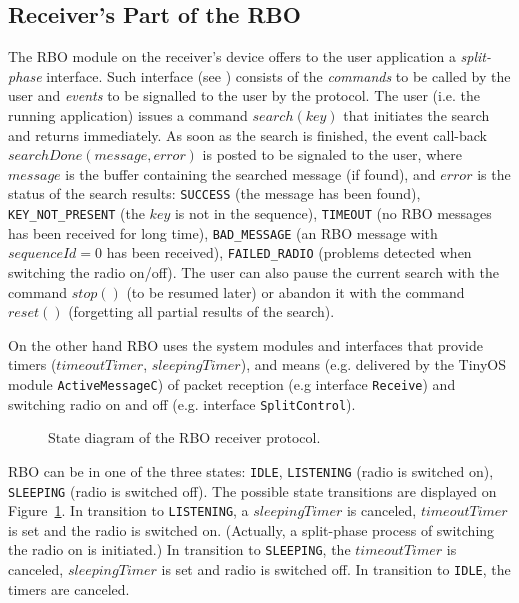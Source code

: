 \documentclass{llncs}
\begin{document}
\subsection{Receiver's Part of the RBO}
The RBO module on the receiver's device offers to the user application a {\em split-phase}
interface.
Such interface (see \cite{TinyOSProgramming}) consists of the {\em commands}
to be called by the user and {\em events} to be signalled to the user by the protocol. 
The user (i.e. the running application) issues a command $search(key)$ that initiates
the search and returns immediately.
As soon as the search is finished, the  event call-back $searchDone(message, error)$
is posted to be signaled to the user,
where $message$ is the buffer containing the searched message (if found),
and $error$ is the status of the search results: 
\verb|SUCCESS| (the message has been found),
\verb|KEY_NOT_PRESENT| (the $key$ is not in the sequence),
\verb|TIMEOUT| (no RBO messages has been received for long time),
\verb|BAD_MESSAGE| (an RBO message with $sequenceId=0$ has been received),
\verb|FAILED_RADIO| (problems detected when switching the radio on/off).
The user can also pause the current search with the command $stop()$ 
(to be resumed later) %
or abandon it with the command $reset()$ (forgetting all partial results of the search).

On the other hand RBO uses the system modules and interfaces that 
provide timers ($timeoutTimer$, $sleepingTimer$), 
and means (e.g. delivered by the TinyOS module \verb|ActiveMessageC|) of packet reception (e.g interface \verb|Receive|) 
and switching radio on and off (e.g. interface \verb|SplitControl|).  
\begin{figure}
\caption{State diagram of the RBO receiver protocol.\label{RBO-states}}
\end{figure}
RBO can be in one of the three states: 
\verb|IDLE|, 
\verb|LISTENING| (radio is switched on),
\verb|SLEEPING| (radio is switched off).
The possible state transitions are displayed on Figure~\ref{RBO-states}.
In transition to \verb|LISTENING|,  a $sleepingTimer$ is canceled,  $timeoutTimer$ is set 
and the radio is switched on. 
(Actually, a split-phase process of switching the radio on
is initiated.)
In transition to \verb|SLEEPING|, the $timeoutTimer$ is canceled,
$sleepingTimer$ is set and radio is switched off.
In transition to \verb|IDLE|, the timers are canceled.
\end{document}
